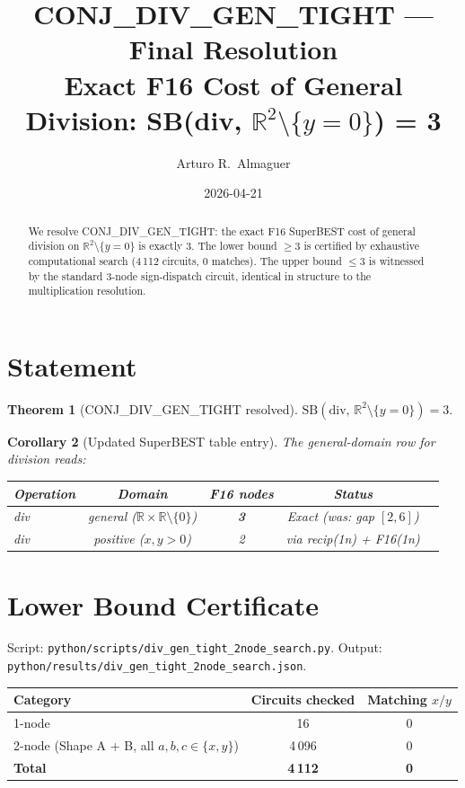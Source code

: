 \documentclass[12pt]{article}
\title{\textbf{CONJ\_DIV\_GEN\_TIGHT --- Final Resolution}\\[0.4em]
\large Exact F16 Cost of General Division: SB(div, $\mathbb{R}^2 \setminus \{y=0\}$) = 3}
\author{Arturo R.\ Almaguer}
\date{2026-04-21}
\newtheorem{theorem}{Theorem}
\newtheorem{corollary}[theorem]{Corollary}
\begin{document}
\maketitle

\begin{abstract}
We resolve CONJ\_DIV\_GEN\_TIGHT: the exact F16 SuperBEST cost of general division
on $\mathbb{R}^2 \setminus \{y = 0\}$ is exactly 3.
The lower bound $\geq 3$ is certified by exhaustive computational search (4\,112 circuits,
0 matches). The upper bound $\leq 3$ is witnessed by the standard 3-node sign-dispatch
circuit, identical in structure to the multiplication resolution.
\end{abstract}

\section{Statement}

\begin{theorem}[CONJ\_DIV\_GEN\_TIGHT resolved]
$\mathrm{SB}(\mathrm{div},\, \mathbb{R}^2 \setminus \{y=0\}) = 3.$
\end{theorem}

\begin{corollary}[Updated SuperBEST table entry]
The general-domain row for division reads:

\begin{center}
\begin{tabular}{lcccc}
\toprule
Operation & Domain & F16 nodes & Status \\
\midrule
div & general ($\mathbb{R} \times \mathbb{R} \setminus \{0\}$) & \textbf{3} & Exact (was: gap $[2,6]$) \\
div & positive ($x,y>0$) & 2 & via recip(1n) + F16(1n) \\
\bottomrule
\end{tabular}
\end{center}
\end{corollary}

\section{Lower Bound Certificate}

Script: \texttt{python/scripts/div\_gen\_tight\_2node\_search.py}.
Output: \texttt{python/results/div\_gen\_tight\_2node\_search.json}.

\begin{center}
\begin{tabular}{lcc}
\toprule
Category & Circuits checked & Matching $x/y$ \\
\midrule
1-node & 16 & 0 \\
2-node (Shape A + B, all $a,b,c \in \{x,y\}$) & 4\,096 & 0 \\
\midrule
\textbf{Total} & \textbf{4\,112} & \textbf{0} \\
\bottomrule
\end{tabular}
\end{center}
\end{document}
